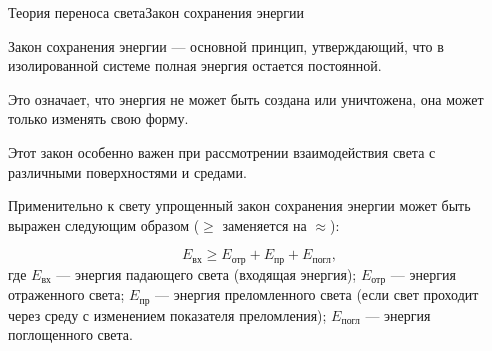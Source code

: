 \documentclass{beamer}
\begin{document}
	\begin{frame}{Теория переноса света}{Закон сохранения энергии}
		
		Закон сохранения энергии --- основной принцип, утверждающий, что в изолированной системе полная энергия остается постоянной. 
		
		Это означает, что энергия не может быть создана или уничтожена, она может только изменять свою форму.
		
		Этот закон особенно важен при рассмотрении взаимодействия света с различными поверхностями и средами. 

		Применительно к свету упрощенный закон сохранения энергии может быть выражен следующим образом ($\geqslant$ заменяется на $\approx $):
		
		\[ E_{\text{вх}} \geqslant E_{\text{отр}} + E_{\text{пр}} + E_{\text{погл}} 
		,\]
		где
		\(E_{\text{вх}}\) --- энергия падающего света (входящая энергия);
		\(E_{\text{отр}}\) --- энергия отраженного света;
		\(E_{\text{пр}}\) --- энергия преломленного света (если свет проходит через среду с изменением показателя преломления);
		\(E_{\text{погл}}\) --- энергия поглощенного света.
		


	\end{frame}
\end{document}
